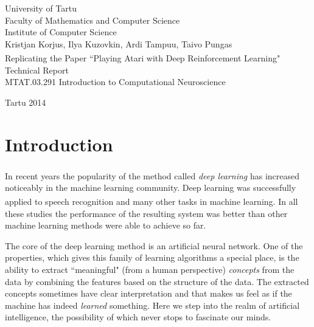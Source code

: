 \documentclass[a4paper,12pt]{article}
\begin{document}
\begin{center}
	{\Large
	University of Tartu\\
	Faculty of Mathematics and Computer Science\\
	Institute of Computer Science\\}
	\vspace{6cm}
	{\Large Kristjan Korjus, Ilya Kuzovkin, Ardi Tampuu, Taivo Pungas}\\
	\vspace{1.0cm}
	{\Huge Replicating the Paper ``Playing Atari with Deep Reinforcement Learning"\textsuperscript{\Large{\cite{mnih2013playing}}}}\\
	\vspace{0.5cm}
	{\Large Technical Report}\\
	\vspace{1.0cm}
	{\large MTAT.03.291 Introduction to Computational Neuroscience}
	
\end{center}
\vspace{9cm}
\begin{center}
	{\large Tartu 2014}
\end{center}
\thispagestyle{empty}
\pagebreak



%
%
\thispagestyle{empty}
\tableofcontents
\pagebreak



%
%
\section*{Introduction}
In recent years the popularity of the method called \emph{deep learning}\textsuperscript{\cite{hinton2007learning}} has increased noticeably in the machine learning community. Deep learning was successfully applied to speech recognition\textsuperscript{\cite{dahl2012context}} and many other tasks in machine learning\textsuperscript{\cite{deng2013new}}. In all these studies the performance of the resulting system was better than other machine learning methods were able to achieve so far.

The core of the deep learning method is an artificial neural network. One of the properties, which gives this family of learning algorithms a special place, is the ability to extract ``meaningful" (from a human perspective) \emph{concepts} from the data by combining the features based on the structure of the data. The extracted concepts sometimes have clear interpretation and that makes us feel as if the machine has indeed \emph{learned} something. Here we step into the realm of artificial intelligence, the possibility of which never stops to fascinate our minds.
\end{document}
